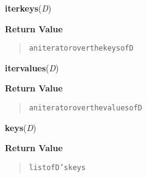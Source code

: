     \label{dict:iterkeys}

    \vspace{0.5ex}

    \begin{boxedminipage}{\textwidth}

    \raggedright \textbf{iterkeys}(\textit{D})

      \textbf{Return Value}
      \begin{quote}
\begin{alltt}
an iterator over the keys of D
\end{alltt}

      \end{quote}

    \vspace{1ex}

    \end{boxedminipage}

    \label{dict:itervalues}

    \vspace{0.5ex}

    \begin{boxedminipage}{\textwidth}

    \raggedright \textbf{itervalues}(\textit{D})

      \textbf{Return Value}
      \begin{quote}
\begin{alltt}
an iterator over the values of D
\end{alltt}

      \end{quote}

    \vspace{1ex}

    \end{boxedminipage}

    \label{dict:keys}

    \vspace{0.5ex}

    \begin{boxedminipage}{\textwidth}

    \raggedright \textbf{keys}(\textit{D})

      \textbf{Return Value}
      \begin{quote}
\begin{alltt}
list of D's keys
\end{alltt}

      \end{quote}

    \vspace{1ex}

    \end{boxedminipage}

